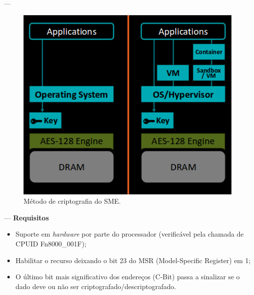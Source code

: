 \documentclass{beamer}
\newcommand{\innertitle}[1]{\textbf{\large {#1}}}
\newcommand{\autotitle}[1]{\secname{} --- \subsecname}
\begin{document}
\begin{frame}{\autotitle{}}
    \begin{figure}
        \centering
        \includegraphics[keepaspectratio,height=.8\textheight]{img/sme}
        \caption{Método de criptografia do SME.}
    \end{figure}
\end{frame}

\begin{frame}{\autotitle{}}
    \innertitle{Requisitos}

    \begin{itemize}
        \item Suporte em \textit{hardware} por parte do processador
            (verificável pela chamada de CPUID Fn8000\_001F);
        \item Habilitar o recurso deixando o bit 23 do MSR (Model-Specific
            Register) em 1;
        \item O último bit mais significativo dos endereços (C-Bit) passa a
            sinalizar se o dado deve ou não ser criptografado/descriptografado.
    \end{itemize}
\end{frame}
\end{document}

